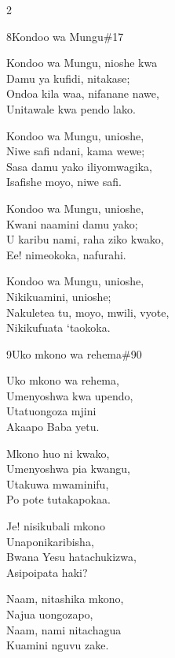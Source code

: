 \documentclass{article}
\begin{document}
\begin{multicols}{2}
\begin{hymn}{8}{Kondoo wa Mungu}{\#17}
\begin{stanza}
Kondoo wa Mungu, nioshe kwa\\
Damu ya kufidi, nitakase;\\
Ondoa kila waa, nifanane nawe,\\
Unitawale kwa pendo lako.
\end{stanza}
\begin{stanza}
Kondoo wa Mungu, unioshe,\\
Niwe safi ndani, kama wewe;\\
Sasa damu yako iliyomwagika,\\
Isafishe moyo, niwe safi.
\end{stanza}
\begin{stanza}
Kondoo wa Mungu, unioshe,\\
Kwani naamini damu yako;\\
U karibu nami, raha ziko kwako,\\
Ee! nimeokoka, nafurahi.
\end{stanza}
\begin{stanza}
Kondoo wa Mungu, unioshe,\\
Nikikuamini, unioshe;\\
Nakuletea tu, moyo, mwili, vyote,\\
Nikikufuata `taokoka.
\end{stanza}
\end{hymn}

\begin{hymn}{9}{Uko mkono wa rehema}{\#90}
\begin{stanza}
Uko mkono wa rehema,\\
Umenyoshwa kwa upendo,\\
Utatuongoza mjini\\
Akaapo Baba yetu.
\end{stanza}
\begin{chorus}
Mkono huo ni kwako,\\
Umenyoshwa pia kwangu,\\
Utakuwa mwaminifu,\\
Po pote tutakapokaa.
\end{chorus}
\begin{stanza}
Je! nisikubali mkono\\
Unaponikaribisha,\\
Bwana Yesu hatachukizwa,\\
Asipoipata haki?
\end{stanza}
\begin{stanza}
Naam, nitashika mkono,\\
Najua uongozapo,\\
Naam, nami nitachagua\\
Kuamini nguvu zake.
\end{stanza}
\end{hymn}


\end{multicols}
\end{document}
